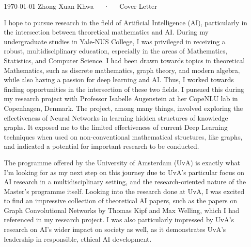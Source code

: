 \documentclass[11pt, a4paper]{awesome-cv}
\begin{document}
\makecvheader[R]

\makecvfooter
  {\today}
  {Zhong Xuan Khwa~~~·~~~Cover Letter}
  {}

\makelettertitle

\begin{cvletter}

  I hope to pursue research in the field of Artificial Intelligence (AI),
  particularly in the intersection between theoretical mathematics and AI.
  During my undergraduate studies in Yale-NUS College, I was privileged in
  receiving a robust, multidisciplinary education, especially in the areas of
  Mathematics, Statistics, and Computer Science. I had been drawn towards topics
  in theoretical Mathematics, such as discrete mathematics, graph theory, and
  modern algebra, while also having a passion for deep learning and AI. Thus, I
  worked towards finding opportunities in the intersection of these two fields.
  I pursued this during my research project with Professor Isabelle Augenstein
  at her CopeNLU lab in Copenhagen, Denmark. The project, among many things,
  involved exploring the effectiveness of Neural Networks in learning hidden
  structures of knowledge graphs. It exposed me to the limited effectiveness of
  current Deep Learning techniques when used on non-conventional mathematical
  structures, like graphs, and indicated a potential for important research to
  be conducted.

  The programme offered by the University of Amsterdam (UvA) is exactly what I’m
  looking for as my next step on this journey due to UvA’s particular focus on
  AI research in a multidisciplinary setting, and the research-oriented nature
  of the Master’s programme itself. Looking into the research done at UvA, I was
  excited to find an impressive collection of theoretical AI papers, such as the
  papers on Graph Convolutional Networks by Thomas Kipf and Max Welling, which I
  had referenced in my research project. I was also particularly impressed by
  UvA’s research on AI’s wider impact on society as well, as it demonstrates
  UvA’s leadership in responsible, ethical AI development.


\end{cvletter}
\end{document}
